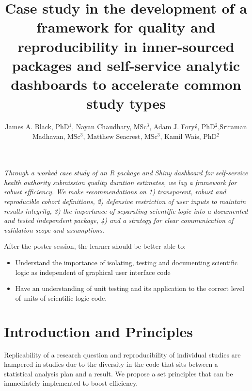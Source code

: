 \documentclass{amia}
\begin{document}

\textit{Through a worked case study of an R package and Shiny dashboard for self-service health authority submission quality duration estimates, we lay a framework for robust efficiency. We make recommendations on 1) transparent, robust and reproducible cohort definitions, 2) defensive restriction of user inputs to maintain results integrity, 3) the importance of separating scientific logic into a documented and tested independent package, 4) and a strategy for clear communication of validation scope and assumptions.}

After the poster session, the learner should be better able to:

\begin{itemize}
  \item Understand the importance of isolating, testing and documenting scientific logic as independent of graphical user interface code
  \item Have an understanding of unit testing and its application to the correct level of units of scientific logic code.
\end{itemize}

\pagebreak

\title{Case study in the development of a framework for quality and reproducibility in inner-sourced packages and self-service analytic dashboards to accelerate common study types}

\author{James A. Black, PhD$^{1}$, Nayan Chaudhary, MSc$^{3}$, Adam J. Foryś, PhD$^{2}$,Sriraman Madhavan, MSc$^{3}$, Matthew Seacrest, MSc$^{3}$, Kamil Wais, PhD$^{2}$} 


\maketitle

\section*{Introduction and Principles}

Replicability of a research question and reproducibility of individual studies are hampered in studies due to the diversity in the code that sits between a statistical analysis plan and a result. We propose a set principles that can be immediately implemented to boost efficiency. 
\end{document}
